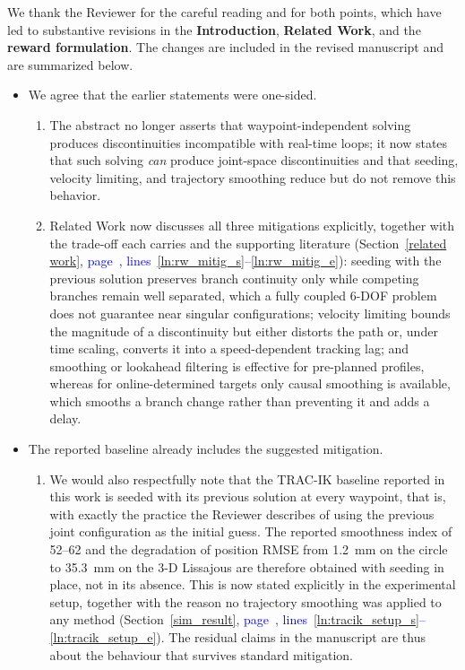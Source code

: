 \documentclass[11pt]{elsarticle}
\newcommand{\mlines}[2]{\textcolor{blue}{page~\pageref{#1}, lines~\ref{#1}--\ref{#2}}}
\begin{document}
\begin{responsebox}
We thank the Reviewer for the careful reading and for both points, which have led to substantive revisions in the \textbf{Introduction}, \textbf{Related Work}, and the \textbf{reward formulation}. The changes are included in the revised manuscript and are summarized below. 

\begin{itemize}
  \item We agree that the earlier statements were one-sided.

  \begin{enumerate}
      \item The abstract no longer asserts that waypoint-independent solving produces discontinuities incompatible with real-time loops; it now states that such solving \emph{can} produce joint-space discontinuities and that seeding, velocity limiting, and trajectory smoothing reduce but do not remove this behavior.
      \item Related Work now discusses all three mitigations explicitly, together with the trade-off each carries and the supporting literature (Section~\ref{related work}, \mlines{ln:rw_mitig_s}{ln:rw_mitig_e}): seeding with the previous solution preserves branch continuity only while competing branches remain well separated, which a fully coupled 6-DOF problem does not guarantee near singular configurations; velocity limiting bounds the magnitude of a discontinuity but either distorts the path or, under time scaling, converts it into a speed-dependent tracking lag; and smoothing or lookahead filtering is effective for pre-planned profiles, whereas for online-determined targets only causal smoothing is available, which smooths a branch change rather than preventing it and adds a delay.
  \end{enumerate}



  
  \item The reported baseline already includes the suggested mitigation. 
  \begin{enumerate}
      \item We would also respectfully note that the TRAC-IK baseline reported in this work is seeded with its previous solution at every waypoint, that is, with exactly the practice the Reviewer describes of using the previous joint configuration as the initial guess. The reported smoothness index of 52--62 and the degradation of position RMSE from 1.2~mm on the circle to 35.3~mm on the 3-D Lissajous are therefore obtained with seeding in place, not in its absence. This is now stated explicitly in the experimental setup, together with the reason no trajectory smoothing was applied to any method (Section~\ref{sim_result}, \mlines{ln:tracik_setup_s}{ln:tracik_setup_e}). The residual claims in the manuscript are thus about the behaviour that survives standard mitigation.
  \end{enumerate}
  


\end{itemize}
\end{responsebox}
\end{document}
